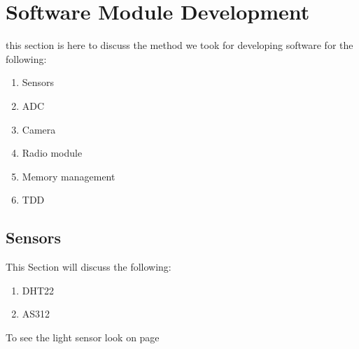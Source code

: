 \section{Software Module Development}
this section is here to discuss the method we took  for  developing software  for the  following:
\begin{enumerate}
    \item Sensors 
    \item ADC
    \item Camera
    \item Radio module
    \item Memory management
    \item  TDD
\end{enumerate}
\subsection{Sensors}
This Section will discuss the following:
\begin{enumerate}
    \item DHT22
    \item AS312
\end{enumerate}
To see the light sensor look on page \pageref{ADC section} 
